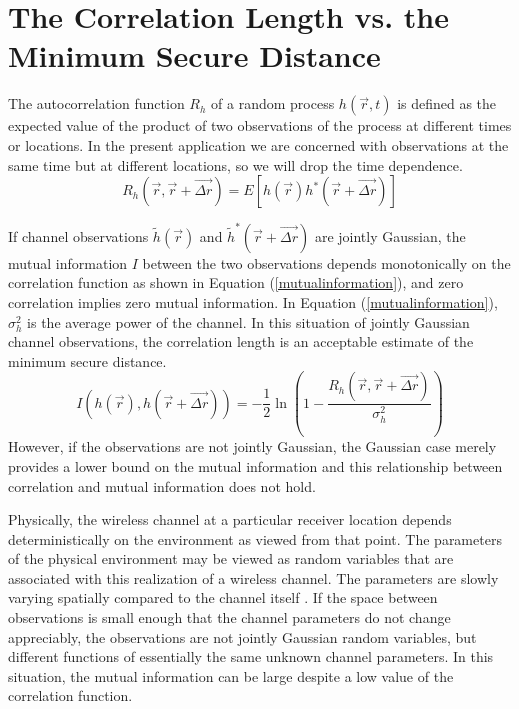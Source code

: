 \documentclass[conference]{ieeetran}
\begin{document}
\section{The Correlation Length vs. the Minimum Secure Distance}
The autocorrelation function $R_h$ of a random process $h(\vec{r},t)$ is defined as the expected value of the product of two observations of the process at different times or locations.  In the present application we are concerned with observations at the same time but at different locations, so we will drop the time dependence.
\begin{equation}\label{ensemblecorr}
R_h(\vec{r},\vec{r}+\vec{\Delta r}) = E[h(\vec{r})h^*(\vec{r}+\vec{\Delta r})]
\end{equation}

If channel observations $\tilde{h}(\vec{r})$ and $\tilde{h}^*(\vec{r}+\vec{\Delta r})$ are jointly Gaussian, the mutual information $I$ between the two observations depends monotonically on the correlation function as shown in Equation (\ref{mutualinformation}), and zero correlation implies zero mutual information.  In Equation (\ref{mutualinformation}), $\sigma_h^2$ is the average power of the channel.  In this situation of jointly Gaussian channel observations, the correlation length is an acceptable estimate of the minimum secure distance.
\begin{equation}\label{mutualinformation}
I(h(\vec{r}),h(\vec{r}+\vec{\Delta r})) = -\frac{1}{2}\ln\left(1-\frac{R_h(\vec{r},\vec{r}+\vec{\Delta r})}{\sigma_h^2}\right)
\end{equation}
However, if the observations are not jointly Gaussian, the Gaussian case merely provides a lower bound on the mutual information and this relationship between correlation and mutual information does not hold. %

Physically, the wireless channel  at a particular receiver location depends deterministically on the environment as viewed from that point.  The parameters of the physical environment may be viewed as random variables that are associated with this realization of a wireless channel.  The parameters are slowly varying spatially compared to the channel   itself \cite{jakes1974, duel-hallen2007}.  If the space between observations is small enough that the channel parameters do not change appreciably, the observations are not jointly Gaussian random variables, but different functions of essentially the same unknown channel parameters.  In this situation, the mutual information can be large despite a low value of the correlation function.
\end{document}
